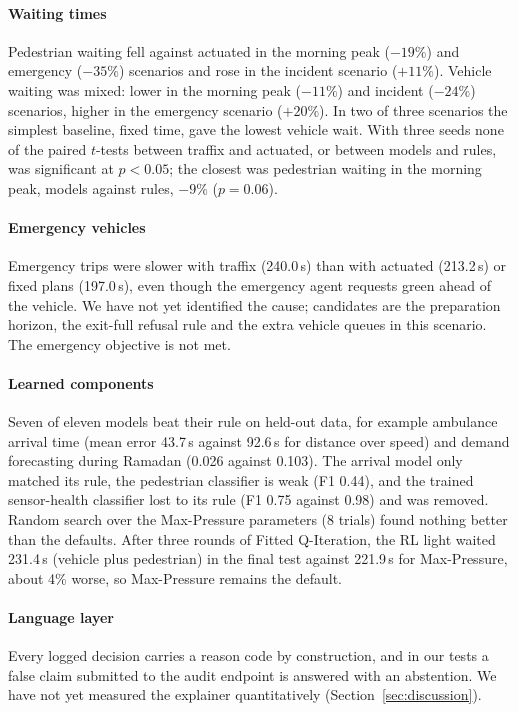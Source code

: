 \documentclass[conference]{IEEEtran}
\begin{document}
\paragraph{Waiting times} Pedestrian waiting fell against actuated in the morning peak
($-19\%$) and emergency ($-35\%$) scenarios and rose in the incident scenario ($+11\%$).
Vehicle waiting was mixed: lower in the morning peak ($-11\%$) and incident ($-24\%$)
scenarios, higher in the emergency scenario ($+20\%$). In two of three scenarios the
simplest baseline, fixed time, gave the lowest vehicle wait. With three seeds none of the
paired $t$-tests between traffix and actuated, or between models and rules, was
significant at $p<0.05$; the closest was pedestrian waiting in the morning peak, models
against rules, $-9\%$ ($p=0.06$).

\paragraph{Emergency vehicles} Emergency trips were slower with traffix (240.0\,s) than with
actuated (213.2\,s) or fixed plans (197.0\,s), even though the emergency agent requests
green ahead of the vehicle. We have not yet identified the cause; candidates are the
preparation horizon, the exit-full refusal rule and the extra vehicle queues in this
scenario. The emergency objective is not met.

\paragraph{Learned components} Seven of eleven models beat their rule on held-out data, for
example ambulance arrival time (mean error 43.7\,s against 92.6\,s for distance over speed)
and demand forecasting during Ramadan (0.026 against 0.103). The arrival model only matched
its rule, the pedestrian classifier is weak (F1 0.44), and the trained sensor-health
classifier lost to its rule (F1 0.75 against 0.98) and was removed. Random search over the
Max-Pressure parameters (8 trials) found nothing better than the defaults. After three
rounds of Fitted Q-Iteration, the RL light waited 231.4\,s (vehicle plus pedestrian) in the
final test against 221.9\,s for Max-Pressure, about 4\% worse, so Max-Pressure remains the
default.

\paragraph{Language layer} Every logged decision carries a reason code by construction, and in
our tests a false claim submitted to the audit endpoint is answered with an abstention. We
have not yet measured the explainer quantitatively (Section~\ref{sec:discussion}).
\end{document}
